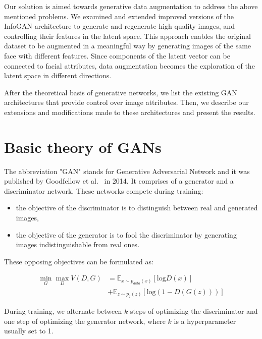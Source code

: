 \documentclass{egpubl}
\begin{document}
Our solution is aimed towards generative data augmentation to address the above mentioned problems. We examined and extended improved versions of the InfoGAN architecture to generate and regenerate high quality images, %
and controlling their features in the latent space. This approach enables the original dataset to be augmented in a meaningful way by %
generating images of the same face with different features. Since %
components of the latent vector can be connected to facial attributes, data augmentation becomes the exploration of the latent space in different directions.

After the theoretical basis of generative networks, %
we list the existing GAN architectures that provide control over image attributes. Then, %
we describe our extensions and modifications made to these architectures and present the results.


\section{Basic theory of GANs}
The abbreviation "GAN" stands for Generative Adversarial Network and it was published by Goodfellow et al.~\cite{goodfellow2014generative} in 2014. It comprises of a generator and a discriminator network. These networks compete during training:

\begin{itemize}
	\item the objective of the discriminator is to distinguish between real and generated images,
	\item the objective of the generator is to fool the discriminator by generating images indistinguishable from real ones. 
\end{itemize}

These opposing objectives can be formulated as:

\begin{equation}
\begin{aligned}
\min_G \max_D V(D,G) &= \mathbb{E}_{x\sim p_{data}(x)}\left[ \mathrm{log}D(x) \right] \\
&+ \mathbb{E}_{z\sim p_{z}(z)}\left[ \mathrm{log}(1-D(G(z)))\right]
\end{aligned}
\end{equation}

During training, %
we alternate between $k$ steps of optimizing the discriminator and one step of optimizing the generator network, where $k$ is a hyperparameter usually set to 1.
\end{document}
